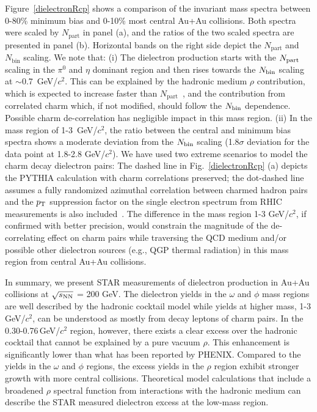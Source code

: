 \documentclass[twocolumn,showpacs,amsmath,amssymb,superscriptaddress,nofootinbib]{revtex4-1}
\newcommand{\sNN}{$\sqrt{s_{\rm NN}}$ }
\newcommand{ \pT }{$p_{\rm T}$ }
\begin{document}
Figure~\ref{dielectronRcp} shows a comparison of the invariant mass spectra between 0-80\% minimum bias and 0-10\% most central Au+Au collisions. Both spectra were scaled by $N_\mathrm{part}$ in panel (a), and the ratios of the two scaled spectra are presented in panel (b).
Horizontal bands on the right side depict the $N_\mathrm{part}$ and $N_\mathrm{bin}$ scaling.
We note that:
(i) The dielectron production starts with the $N_{\rm part}$ scaling in the $\pi^{0}$ and $\eta$ dominant region and then rises towards the $N_{\rm bin}$ scaling at $\sim$0.7\ GeV/$c^2$.
This can be explained by the hadronic medium $\rho$ contribution, which is expected to increase faster than $N_\mathrm{part}$~\cite{RappPriv,RhoOmega}, and the contribution from correlated charm which, if not modified, should follow the $N_{\rm bin}$ dependence. Possible charm de-correlation has negligible impact in this mass region.
(ii) In the mass region of 1-3\ GeV/$c^2$, the ratio between the central and minimum bias spectra shows a moderate deviation from the $N_{\rm bin}$ scaling (1.8$\sigma$ deviation for the data point at 1.8-2.8 GeV/$c^2$).
We have used two extreme scenarios to model the charm decay dielectron pairs: The dashed line in Fig.~\ref{dielectronRcp} (a) depicts the PYTHIA calculation with charm correlations preserved; the dot-dashed line assumes a fully randomized azimuthal correlation between charmed hadron pairs and the \pT suppression factor on the single electron spectrum from RHIC measurements is also included~\cite{NPERaa}.
The difference in the mass region 1-3 GeV/$c^2$, if confirmed with better precision, would constrain the magnitude of the de-correlating effect on charm pairs while traversing the QCD medium and/or possible other dielectron sources (e.g., QGP thermal radiation) in this mass region from central Au+Au collisions.

In summary, we present STAR measurements of dielectron production in Au+Au collisions at \sNN = 200 GeV.
The dielectron yields in the $\omega$ and $\phi$ mass regions are well described by the hadronic cocktail model while yields at higher mass, 1-3\,GeV/$c^2$, can be understood as mostly from decay leptons of charm pairs. In the 0.30-0.76\,GeV/$c^2$ region, however, there exists a clear excess over the hadronic cocktail that cannot be explained by a pure vacuum $\rho$. This enhancement is significantly lower than what has been reported by PHENIX.  Compared to the yields in the $\omega$ and $\phi$ regions, the excess yields in the $\rho$ region exhibit stronger growth with more central collisions.
Theoretical model calculations that include a broadened $\rho$ spectral function from interactions with the hadronic medium can describe the STAR measured dielectron excess at the low-mass region.
\end{document}

